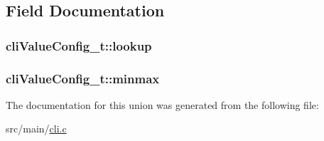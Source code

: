 \subsection{Field Documentation}
\hypertarget{unioncliValueConfig__t_af86ae6a10d239cedd65bcb4a55e3bc4e}{
\subsubsection[{lookup}]{ cli\+Value\+Config\+\_\+t\+::lookup}}\label{unioncliValueConfig__t_af86ae6a10d239cedd65bcb4a55e3bc4e}
\hypertarget{unioncliValueConfig__t_a8326730c4b8948749e09b100a7054a6d}{
\subsubsection[{minmax}]{ cli\+Value\+Config\+\_\+t\+::minmax}}\label{unioncliValueConfig__t_a8326730c4b8948749e09b100a7054a6d}


The documentation for this union was generated from the following file\+:\begin{DoxyCompactItemize}
\item 
src/main/\hyperlink{cli_8c}{cli.\+c}\end{DoxyCompactItemize}
